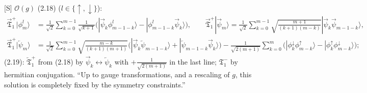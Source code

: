 \documentclass[10pt]{article}
\begin{document}
[S] $\mathcal O(g)$ (2.18) ($l\in\{\uparrow,\downarrow\}$):
\begin{equation*}
\begin{aligned}
\overrightarrow{\mathfrak T}^+_1|\phi^l_m\rangle&=\frac1{\sqrt2}\sum_{k=0}^{m-1}\frac1{\sqrt{k+1}}\Big(|\overrightarrow\psi_k\phi^l_{m-1-k}\rangle-|\phi^l_{m-1-k}\overrightarrow\psi_k\rangle\Big),\qquad
\overrightarrow{\mathfrak T}^+_1|\overrightarrow\psi_m\rangle=\frac1{\sqrt2}\sum_{k=0}^{m-1}\sqrt{\frac{m+1}{(k+1)(m-k)}}|\overrightarrow\psi_k\overrightarrow\psi_{m-1-k}\rangle,\\
\overrightarrow{\mathfrak T}^+_1|\overleftarrow\psi_m\rangle&=\frac1{\sqrt2}\sum_{k=0}^{m-1}\sqrt{\frac{m-k}{(k+1)(m+1)}}\Big(|\overrightarrow\psi_k\overleftarrow\psi_{m-1-k}\rangle+|\overleftarrow\psi_{m-1-k}\overrightarrow\psi_k\rangle\Big)-\frac{1}{\sqrt{2(m+1)}}\sum_{k=0}^m\Big(|\phi^\downarrow_k\phi^\uparrow_{m-k}\rangle-|\phi^\uparrow_k\phi^\downarrow_{m-k}\rangle\Big);
\end{aligned}
\end{equation*}
(2.19): $\overleftarrow{\mathfrak T}^+_1$ from (2.18) by $\overrightarrow\psi_k\leftrightarrow\overleftarrow\psi_k$ with $+\frac{1}{\sqrt{2(m+1)}}$ in the last line; $\mathfrak T^-_1$ by hermitian conjugation. ``Up to gauge transformations, and a rescaling of $g$, this solution is completely fixed by the symmetry constraints.''
\end{document}
